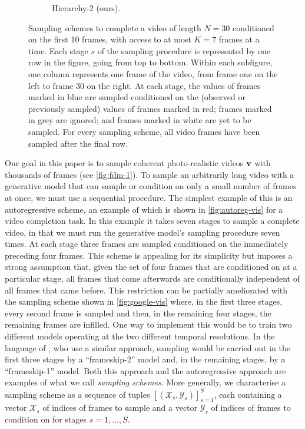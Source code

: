 \begin{figure}[t!]
\begin{subfigure}[t]{0.24\textwidth}
        \caption{Hierarchy-2 (ours).} \label{fig:hierarchy-vis}
    \end{subfigure}%
    \caption{Sampling schemes to complete a video of length $N=30$ conditioned on the first 10 frames, with access to at most $K=7$ frames at a time. Each stage $s$ of the sampling procedure is represented by one row in the figure, going from top to bottom. Within each subfigure, one column represents one frame of the video, from frame one on the left to frame 30 on the right. At each stage, the values of frames marked in blue are sampled conditioned on the (observed or previously sampled) values of frames marked in red; frames marked in grey are ignored; and frames marked in white are yet to be sampled. For every sampling scheme, all video frames have been sampled after the final row.
    }
\end{figure}

Our goal in this paper is to sample coherent photo-realistic videos ${\mathbf{v}}$ with thousands of frames (see \cref{fig:fdm-1}). 
%
To sample an arbitrarily long video with a generative model that can sample or condition on only a small number of frames at once, we must use a sequential procedure. The simplest example of this is an autoregressive scheme, an example of which is shown in \cref{fig:autoreg-vis} for a video completion task. 
%
In this example it takes seven stages to sample a complete video, in that we must run the generative model's sampling procedure seven times. 
%
At each stage three frames are sampled conditioned on the immediately preceding four frames. This scheme is appealing for its simplicity but imposes a strong assumption that, given the set of four frames that are conditioned on at a particular stage, all frames that come afterwards are conditionally independent of all frames that came before. This restriction can be partially ameliorated with the sampling scheme shown in \cref{fig:google-vis} where, in the first three stages, every second frame is sampled and then, in the remaining four stages, the remaining frames are infilled. One way to implement this would be to train two different models operating at the two different temporal resolutions. 
%
In the language of \citet{ho2022video}, who use a similar approach, sampling would be carried out in the first three stages by a ``frameskip-2'' model and, in the remaining stages, by a ``frameskip-1'' model. Both this approach and the autoregressive approach are examples of what we call \textit{sampling schemes}.
%
More generally, we characterise a sampling scheme as a sequence of tuples $[(\mathcal{X}_s, \mathcal{Y}_s)]_{s=1}^S$, each containing a vector $\mathcal{X}_s$ of indices of frames to sample and a vector $\mathcal{Y}_s$ of indices of frames to condition on for stages $s = 1,\ldots,S$. 

